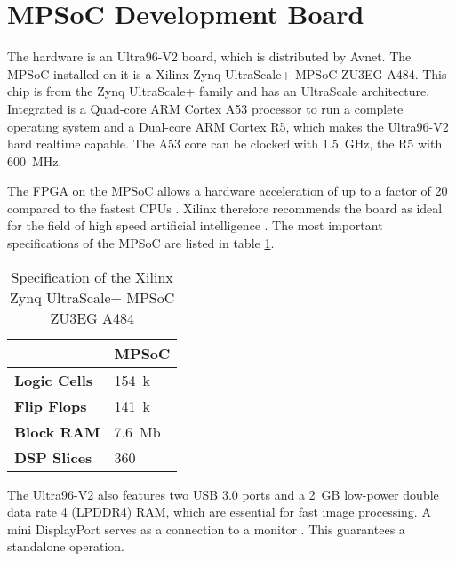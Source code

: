 \section{MPSoC Development Board}
\label{sec:board}

The hardware is an Ultra96-V2 board, which is distributed by Avnet.
The MPSoC installed on it is a Xilinx Zynq UltraScale+ MPSoC ZU3EG A484.
This chip is from the Zynq UltraScale+ family and has an UltraScale architecture.
Integrated is a Quad-core ARM Cortex A53 processor to run a complete operating system and a Dual-core ARM Cortex R5, which makes the Ultra96-V2 hard realtime capable.
The A53 core can be clocked with \SI{1.5}{GHz}, the R5 with \SI{600}{MHz}.

The FPGA on the MPSoC allows a hardware acceleration of up to a factor of 20 compared to the fastest CPUs \cite{acceleration_xilinx}.
Xilinx therefore recommends the board as ideal for the field of high speed artificial intelligence \cite{ai_resources_xilinx}.
The most important specifications of the MPSoC are listed in table \ref{tab:specs_MPSoC}.

\begin{table}[h]
	\caption{Specification of the Xilinx Zynq UltraScale+ MPSoC ZU3EG A484 \cite{xilinx_zynq}}
	\label{tab:specs_MPSoC}
	\centering
	\begin{tabular}{ll}
		\toprule
		& \textbf{MPSoC} \\
		\midrule
		\textbf{Logic Cells} & \SI{154}{k} \\
		\textbf{Flip Flops} & \SI{141}{k} \\
		\textbf{Block RAM} & \SI{7.6}{Mb} \\
		\textbf{DSP Slices} & 360 \\
		\bottomrule
	\end{tabular}
\end{table}

The Ultra96-V2 also features two USB 3.0 ports and a \SI{2}{GB} low-power double data rate 4 (LPDDR4) RAM, which are essential for fast image processing.
A mini DisplayPort serves as a connection to a monitor \cite{avnet_ultra96v2}.
This guarantees a standalone operation.
